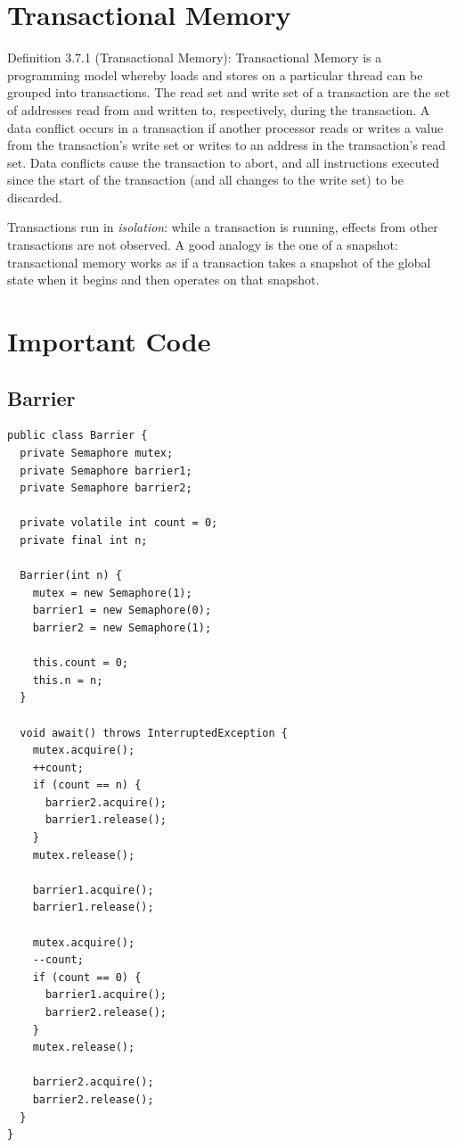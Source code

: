 \documentclass{article}
\begin{document}
\section{Transactional Memory}
Definition 3.7.1 (Transactional Memory): Transactional Memory is a programming model whereby loads and stores on a particular thread can be grouped into transactions. The read set and write set of a transaction are the set of addresses read from and written to, respectively, during the transaction. A data conflict occurs in a transaction if another processor reads or writes a value from the transaction's write set or writes to an address in the transaction's read set. Data conflicts cause the transaction to abort, and all instructions executed since the start of the transaction (and all changes to the write set) to be discarded.

Transactions run in \textit{isolation}: while a transaction is running, effects from other transactions are not observed. A good analogy is the one of a snapshot: transactional memory works as if a transaction takes a snapshot of the global state when it begins and then operates on that snapshot.

\section{Important Code}

\subsection{Barrier}
\begin{lstlisting}[style=java]
public class Barrier {
  private Semaphore mutex;
  private Semaphore barrier1;
  private Semaphore barrier2;

  private volatile int count = 0;
  private final int n;
 
  Barrier(int n) {
    mutex = new Semaphore(1);
    barrier1 = new Semaphore(0);
    barrier2 = new Semaphore(1);
        
    this.count = 0;
    this.n = n;
  }

  void await() throws InterruptedException {
    mutex.acquire();
    ++count;
    if (count == n) {
      barrier2.acquire();
      barrier1.release();
    }
    mutex.release();
        
    barrier1.acquire();
    barrier1.release();
        
    mutex.acquire();
    --count;
    if (count == 0) {
      barrier1.acquire();
      barrier2.release();
    }
    mutex.release();
        
    barrier2.acquire();
    barrier2.release();
  }
}
\end{lstlisting}
\end{document}
